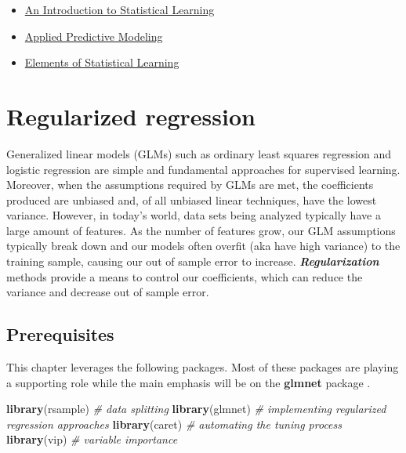 \documentclass[]{book}
\newenvironment{Shaded}{\begin{snugshade}}{\end{snugshade}}
\newcommand{\CommentTok}[1]{\textcolor[rgb]{0.56,0.35,0.01}{\textit{#1}}}
\newcommand{\KeywordTok}[1]{\textcolor[rgb]{0.13,0.29,0.53}{\textbf{#1}}}
\newcommand{\NormalTok}[1]{#1}
\providecommand{\tightlist}{%
  \setlength{\itemsep}{0pt}\setlength{\parskip}{0pt}}
\theoremstyle{definition}
\theoremstyle{definition}
\theoremstyle{definition}
\theoremstyle{remark}
\begin{document}
\begin{itemize}
\tightlist
\item
  \href{http://www-bcf.usc.edu/~gareth/ISL/}{An Introduction to
  Statistical Learning}
\item
  \href{http://appliedpredictivemodeling.com/}{Applied Predictive
  Modeling}
\item
  \href{https://statweb.stanford.edu/~tibs/ElemStatLearn/}{Elements of
  Statistical Learning}
\end{itemize}

\hypertarget{regularized-regression}{%
\chapter{Regularized regression}\label{regularized-regression}}

Generalized linear models (GLMs) such as ordinary least squares
regression and logistic regression are simple and fundamental approaches
for supervised learning. Moreover, when the assumptions required by GLMs
are met, the coefficients produced are unbiased and, of all unbiased
linear techniques, have the lowest variance. However, in today's world,
data sets being analyzed typically have a large amount of features. As
the number of features grow, our GLM assumptions typically break down
and our models often overfit (aka have high variance) to the training
sample, causing our out of sample error to increase.
\textbf{\emph{Regularization}} methods provide a means to control our
coefficients, which can reduce the variance and decrease out of sample
error.

\hypertarget{prerequisites-5}{%
\section{Prerequisites}\label{prerequisites-5}}

This chapter leverages the following packages. Most of these packages
are playing a supporting role while the main emphasis will be on the
\textbf{glmnet} package \citep{pkg-glmnet}.

\begin{Shaded}
\begin{Highlighting}[]
\KeywordTok{library}\NormalTok{(rsample)  }\CommentTok{# data splitting }
\KeywordTok{library}\NormalTok{(glmnet)   }\CommentTok{# implementing regularized regression approaches}
\KeywordTok{library}\NormalTok{(caret)    }\CommentTok{# automating the tuning process}
\KeywordTok{library}\NormalTok{(vip)      }\CommentTok{# variable importance}
\end{Highlighting}
\end{Shaded}
\end{document}
